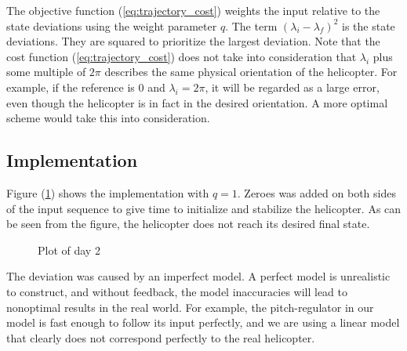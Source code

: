 The objective function (\ref{eq:trajectory_cost}) weights %
the input relative to the state deviations using the weight parameter $q$. The term $(\lambda_i - \lambda_f)^2$ is the state deviations. They are squared to prioritize the largest deviation. Note that the cost function (\ref{eq:trajectory_cost}) does not take into consideration that $\lambda_i$ plus some multiple of $2\pi$ describes the same physical orientation of the helicopter. For example, if the reference is $0$ and $\lambda_i = 2\pi$, it will be regarded as a large error, even though the helicopter is in fact in the desired orientation. A more optimal scheme would take this into consideration.


\subsection{Implementation}

Figure (\ref{fig:day2_plot}) shows the implementation with $q = 1$. Zeroes was added on both sides of the input sequence to give time to initialize and stabilize the helicopter. As can be seen from the figure, the helicopter does not reach its desired final state. 

\begin{figure}[htb]
	\centering
	\caption{Plot of day 2}
	\label{fig:day2_plot}
\end{figure}

The deviation was caused by an imperfect model. A perfect model is  unrealistic to construct, and without feedback, the model inaccuracies will lead to nonoptimal results in the real world. For example, the pitch-regulator in our model is fast enough to follow its input perfectly, and we are using a linear model that clearly does not correspond perfectly to the real helicopter.